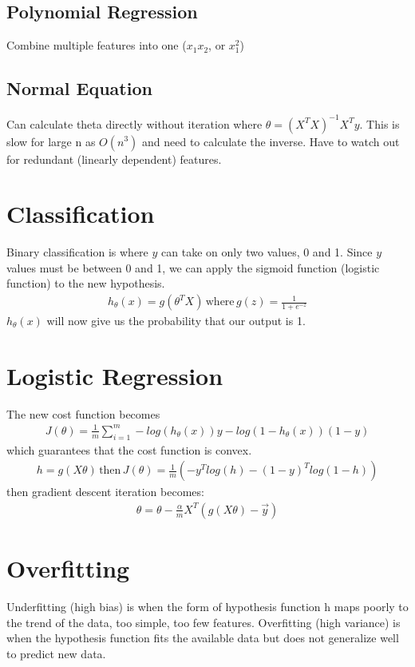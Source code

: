\documentclass[12pt]{article}
\begin{document}
\subsection{Polynomial Regression}
Combine multiple features into one ($x_1x_2$, or $x_1^2$)

\subsection{Normal Equation}
Can calculate theta directly without iteration where $\theta = (X^TX)^{-1}X^Ty$. This is slow for large n as $O(n^3)$ and need to calculate the inverse. Have to watch out for redundant (linearly dependent) features.

\section{Classification}
Binary classification is where $y$ can take on only two values, 0 and 1. Since $y$ values must be between 0 and 1, we can apply the sigmoid function (logistic function) to the new hypothesis.
\begin{align*}
	h_\theta (x)=g(\theta^TX)\,\text{where}\, g(z) = \frac{1}{1+e^{-z}}
\end{align*}
$h_\theta (x)$ will now give us the probability that our output is 1.

\section{Logistic Regression}
The new cost function becomes 
\begin{align*}
	J(\theta)=\frac{1}{m}\sum_{i=1}^{m}-log(h_\theta (x))y-log(1-h_\theta (x))(1-y)
\end{align*}
which guarantees that the cost function is convex.
\begin{align*}
	h = g(X\theta) \,\text{then}\, J(\theta)=\frac{1}{m}(-y^Tlog(h)-(1-y)^Tlog(1-h))
\end{align*}
then gradient descent iteration becomes:
\begin{align*}
	\theta = \theta - \frac{\alpha}{m}X^T(g(X\theta)-\overrightarrow{y})
\end{align*}

\section{Overfitting}
Underfitting (high bias) is when the form of hypothesis function h maps poorly to the trend of the data, too simple, too few features. Overfitting (high variance) is when the hypothesis function fits the available data but does not generalize well to predict new data.
\end{document}
